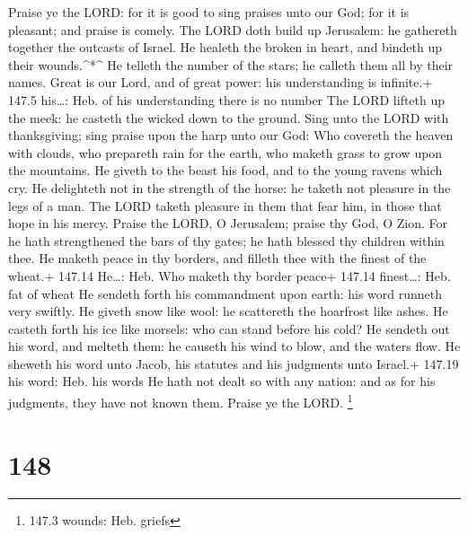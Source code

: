  Praise ye the LORD: for it is good to sing praises unto our
God; for it is pleasant; and praise is comely.  The LORD
doth build up Jerusalem: he gathereth together the outcasts of Israel.
 He healeth the broken in heart, and bindeth up their
wounds.\^{}*\^{}  He telleth the number of the stars; he
calleth them all by their names.  Great is our Lord, and of
great power: his understanding is infinite.+ 147.5 his\ldots: Heb. of
his understanding there is no number  The LORD lifteth up
the meek: he casteth the wicked down to the ground.  Sing
unto the LORD with thanksgiving; sing praise upon the harp unto our God:
 Who covereth the heaven with clouds, who prepareth rain for
the earth, who maketh grass to grow upon the mountains.  He
giveth to the beast his food, and to the young ravens which cry.
 He delighteth not in the strength of the horse: he taketh
not pleasure in the legs of a man.  The LORD taketh
pleasure in them that fear him, in those that hope in his mercy.
 Praise the LORD, O Jerusalem; praise thy God, O Zion.
 For he hath strengthened the bars of thy gates; he hath
blessed thy children within thee.  He maketh peace in thy
borders, and filleth thee with the finest of the wheat.+ 147.14
He\ldots: Heb. Who maketh thy border peace+ 147.14 finest\ldots: Heb.
fat of wheat  He sendeth forth his commandment upon earth:
his word runneth very swiftly.  He giveth snow like wool:
he scattereth the hoarfrost like ashes.  He casteth forth
his ice like morsels: who can stand before his cold?  He
sendeth out his word, and melteth them: he causeth his wind to blow, and
the waters flow.  He sheweth his word unto Jacob, his
statutes and his judgments unto Israel.+ 147.19 his word: Heb. his words
 He hath not dealt so with any nation: and as for his
judgments, they have not known them. Praise ye the LORD. \footnote{147.3
  wounds: Heb. griefs}

\hypertarget{section-148}{%
\section{148}\label{section-148}}

